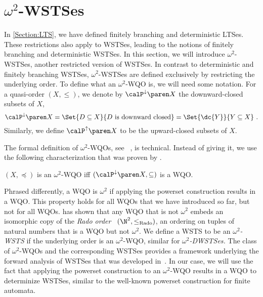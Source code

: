 \documentclass[../../diss.tex]{subfiles}
\begin{document}
\section{\texorpdfstring{$\omega^2$}{Omega-squared}-WSTSes}%
\label{Section:OmegaSquareWSTSes}

In \cref{Section:LTS}, we have defined finitely branching and deterministic LTSes.
These restrictions also apply to WSTSes, leading to the notions of finitely branching and deterministic WSTSes.
In this section, we will introduce $\omega^2$-WSTSes, another restricted version of WSTSes.
In contrast to deterministic and finitely branching WSTSes, $\omega^2$-WSTSes are defined exclusively by restricting the underlying order.
To define what an $\omega^2$-WQO is, we will need some notation.
For a quasi-order $(X,\leq)$, we denote by $\pwrsetdown{X}$ the downward-closed subsets of $X$,
\[
    \pwrsetdown{X}
    = \Set{ D \subseteq X }{ D \text{ is downward closed}}
    = \Set{ \dc{Y} }{ Y \subseteq X}
    \ .
\]
Similarly, we define $\pwrsetup{X}$ to be the upward-closed subsets of $X$.

The formal definition of $\omega^2$-WQOs, see \eg~\cite{Marcone94}, is technical.
Instead of giving it, we use the following characterization that was proven by .

\begin{lemma}%
\label{Lemma:WSTSOmegaSquareCharacterization}%
    $(X, \preceq)$ is an $\omega^2$-WQO iff $(\pwrsetdown{X}, \subseteq)$ is a WQO.\@
\end{lemma}

Phrased differently, a WQO is $\omega^2$ if applying the powerset construction results in a WQO.\@
This property holds for all WQOs that we have introduced so far, but not for all WQOs.
 has shown that any WQO that is not $\omega^2$ embeds an isomorphic copy of the \emph{Rado order}~\cite{Rado54} $(\N^2,\leq_{\text{Rado}})$, an ordering on tuples of natural numbers that is a WQO but not $\omega^2$.
We define a WSTS to be an \emph{$\omega^2$-WSTS} if the underlying order is an $\omega^2$-WQO, similar for \emph{$\omega^2$-DWSTSes.}
The class of $\omega^2$-WQOs and the corresponding WSTSes provides a framework underlying the forward analysis of WSTSes that was  developed in~\cite{GeeraertsRV06,FinkelG09,FinkelG12}.
In our case, we will use the fact that applying the powerset construction to an $\omega^2$-WQO results in a WQO to determinize WSTSes, similar to the well-known powerset construction for finite automata.
\end{document}
